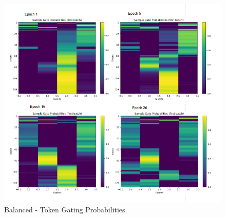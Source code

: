 \documentclass{article}
\begin{document}
\begin{figure}[H]
    \centering
    \includegraphics[width=0.7\linewidth]{b_tokens.png}
    \caption{Balanced - Token Gating Probabilities.}
    \label{fig:t}
\end{figure}
\end{document}

